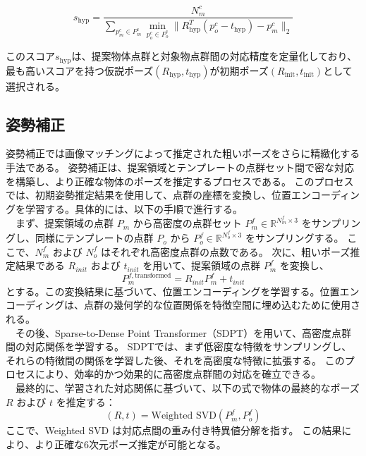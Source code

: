 \[
s_{\text{hyp}} = \frac{N_m^c}{\sum_{p_m^c \in P_m^c} \min_{p_o^c \in P_o^c} \| R_{\text{hyp}}^T (p_o^c - t_{\text{hyp}}) - p_m^c \|_2 }
\]

このスコア$s_{\text{hyp}}$は、提案物体点群と対象物点群間の対応精度を定量化しており、最も高いスコアを持つ仮説ポーズ$(R_{\text{hyp}}, t_{\text{hyp}})$が初期ポーズ$(R_{\text{init}}, t_{\text{init}})$として選択される。

\subsection{姿勢補正}
姿勢補正では画像マッチングによって推定された粗いポーズをさらに精緻化する手法である。
姿勢補正は、提案領域とテンプレートの点群セット間で密な対応を構築し、より正確な物体のポーズを推定するプロセスである。
このプロセスでは、初期姿勢推定結果を使用して、点群の座標を変換し、位置エンコーディングを学習する。具体的には、以下の手順で進行する。\\
　まず、提案領域の点群 $P_m$ から高密度の点群セット $P_m^f \in \mathbb{R}^{N_m^f \times 3}$ をサンプリングし、同様にテンプレートの点群 $P_o$ から $P_o^f \in \mathbb{R}^{N_o^f \times 3}$ をサンプリングする。
ここで、$N_m^f$ および $N_o^f$ はそれぞれ高密度点群の点数である。
次に、粗いポーズ推定結果である $R_{init}$ および $t_{init}$ を用いて、提案領域の点群 $P_m^f$ を変換し、
\[
P_m^{f, \text{transformed}} = R_{init} P_m^f + t_{init}
\]
とする。この変換結果に基づいて、位置エンコーディングを学習する。位置エンコーディングは、点群の幾何学的な位置関係を特徴空間に埋め込むために使用される。\\
　その後、Sparse-to-Dense Point Transformer（SDPT）を用いて、高密度点群間の対応関係を学習する。
SDPTでは、まず低密度な特徴をサンプリングし、それらの特徴間の関係を学習した後、それを高密度な特徴に拡張する。
このプロセスにより、効率的かつ効果的に高密度点群間の対応を確立できる。\\
　最終的に、学習された対応関係に基づいて、以下の式で物体の最終的なポーズ $R$ および $t$ を推定する：
\[
(R, t) = \text{Weighted SVD}(P_m^f, P_o^f)
\]
ここで、Weighted SVD は対応点間の重み付き特異値分解を指す。
この結果により、より正確な6次元ポーズ推定が可能となる。
